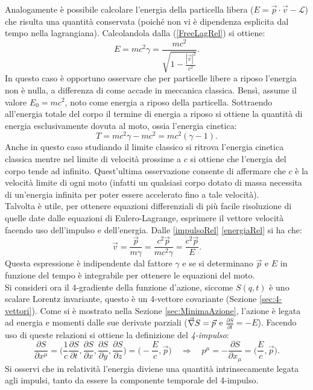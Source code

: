 Analogamente è possibile calcolare l'energia della particella libera ($E = \vec{p}\cdot\vec{v}-\mathcal{L} $) che risulta una quantità conservata (poiché non vi è dipendenza esplicita dal tempo nella lagrangiana). Calcolandola dalla (\ref{FreeLagRel}) si ottiene:
\begin{equation}
    E = mc^2\gamma=\frac{mc^2}{\sqrt{1-\frac{|\vec{v}|^2}{c^2}}}.\label{energiaRel}
\end{equation}
In questo caso è opportuno osservare che per particelle libere a riposo l'energia non è nulla, a differenza di come accade in meccanica classica. Bensì, assume il valore $E_0=mc^2$, noto come energia a riposo della particella. Sottraendo all'energia totale del corpo il termine di energia a riposo si ottiene la quantità di energia esclusivamente dovuta al moto, ossia l'energia cinetica:
\begin{equation}
    T=mc^2\gamma-mc^2=mc^2(\gamma-1).
\end{equation}
Anche in questo caso studiando il limite classico si ritrova l'energia cinetica classica mentre nel limite di velocità prossime a $c$ si ottiene che l'energia del corpo tende ad infinito. Quest'ultima osservazione consente di affermare che $c$ è la velocità limite di ogni moto (infatti un qualsiasi corpo dotato di massa necessita di un'energia infinita per poter essere accelerato fino a tale velocità).\\

Talvolta è utile, per ottenere equazioni differenziali di più facile risoluzione di quelle date dalle equazioni di Eulero-Lagrange, esprimere il vettore velocità facendo uso dell'impulso e dell'energia. Dalle \eqref{impulsoRel} \eqref{energiaRel} si ha che:
\begin{equation}
    \vec v=\frac{\vec p}{m\gamma}=\frac{c^2\vec p}{mc^2\gamma}=\frac{c^2\vec p}{E}.\label{velPE}
\end{equation}    
Questa espressione è indipendente dal fattore $\gamma$ e se si determinano $\vec p$ e $E$ in funzione del tempo è integrabile per ottenere le equazioni del moto.\\

Si consideri ora il 4-gradiente della funzione d'azione, siccome $S(q,t)$ è uno scalare Lorentz invariante, questo è un 4-vettore covariante (Sezione \ref{sec:4-vettori}). Come si è mostrato nella Sezione \ref{sec:MinimaAzione}, l'azione è legata ad energia e momenti dalle sue derivate parziali ($\vec{\nabla} S=\vec{p}$ e $\frac{\partial S }{\partial t}=-E$). Facendo uso di queste relazioni si ottiene la definizione del \emph{4-impulso}:
\begin{equation}
   \frac{\partial S}{\partial x^\mu}= \bigg(\frac{1}{c}\frac{\partial S }{\partial t},\frac{\partial S }{\partial x},\frac{\partial S }{\partial y},\frac{\partial S }{\partial z}\bigg)=\bigg(-\frac{E}{c},\vec{p}\bigg)\quad \Rightarrow \quad
   p^\mu=-\frac{\partial S }{\partial x_\mu}=\bigg(\frac{E}{c},\vec{p}\bigg).
\end{equation}
Si osservi che in relatività l'energia diviene una quantità intrinsecamente legata agli impulsi, tanto da essere la componente temporale del 4-impulso.\\

